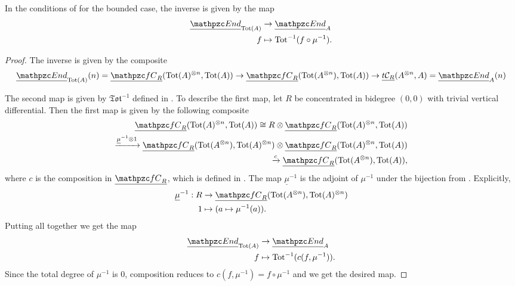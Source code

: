 \documentclass[Thesis.tex]{subfiles}
\begin{document}
\begin{lem}\label{composition}
In the conditions of  for the bounded case, the inverse is given by the map
\begin{align*}
\uEnd_{\Tot(A)}&\to\uEnd_A\\
f & \mapsto \Tot^{-1}(f\circ \mu^{-1}).
\end{align*}
\end{lem}
\begin{proof}
The inverse is given by the composite
\[\uEnd_{\Tot(A)}(n)=\ufC(\Tot(A)^{\otimes n},\Tot(A))\to \ufC(\Tot(A^{\otimes n}),\Tot(A))\to\utC(A^{\otimes n},A)=\uEnd_A(n) \]

The second map is given by $\mathfrak{Tot}^{-1}$ defined in . To describe the first map, let $R$ be concentrated in bidegree $(0,0)$ with trivial vertical differential. Then the first map is given by the following composite
\begin{align*}
\ufC(\Tot(A)^{\otimes n},\Tot(A))\cong R\otimes\ufC(\Tot(A)^{\otimes n},\Tot(A))\\
\xrightarrow{\underline{\mu}^{-1}\otimes 1}\ufC(\Tot(A^{\otimes n}),\Tot(A)^{\otimes n})\otimes\ufC(\Tot(A)^{\otimes n},\Tot(A))\\
\xrightarrow{c}\ufC(\Tot(A^{\otimes n}),\Tot(A)), 
\end{align*}
where $c$ is the composition in $\ufC$, which is defined in . The map $\underline{\mu}^{-1}$ is the adjoint of $\mu^{-1}$ under the bijection from . Explicitly,
\begin{align*}
\underline{\mu}^{-1}:R &\to \ufC(\Tot(A^{\otimes n}),\Tot(A)^{\otimes n})\\
1 &\mapsto (a\mapsto \mu^{-1}(a)).
\end{align*}
Putting all together we get the map 
\begin{align*}
\uEnd_{\Tot(A)}&\to\uEnd_A\\
f & \mapsto \Tot^{-1}(c(f, \mu^{-1})).
\end{align*}
Since the total degree of $\mu^{-1}$ is 0, composition reduces to $c(f,\mu^{-1})=f\circ \mu^{-1}$ and we get the desired map.
\end{proof}
\end{document}
